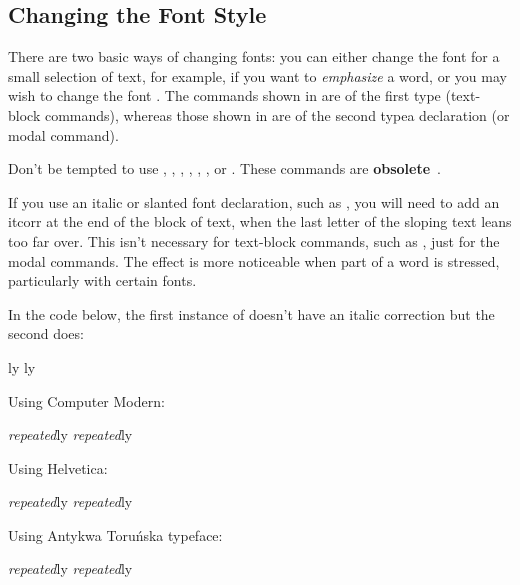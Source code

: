 \reportpagebreak
{}
\subsection{Changing the Font Style}
\label{sec:fontstyle}

There are two basic ways of changing fonts: you can either change
the font for a small selection of text, for example, if you want to
\emph{emphasize} a word, or you may wish to change the font . The \glspl{command} shown in
 are of the first type (text-block
commands), whereas those shown
in  are of the second type\dash a
\gls{declaration} (or modal command).


\warning Don't be tempted to use , , , 
, , ,  or . 
These commands are \textbf{obsolete}~\cite{l2tabu}.

If you use an italic or slanted font declaration, such as
, you will need to add an 
\gls{itcorr} at the end of the block of text, when the last letter
of the sloping text leans too far over. This isn't necessary for
text-block commands, such as , just for the modal
commands. The effect is more noticeable when part of a word is
stressed, particularly with certain fonts.


In the code below, the first instance of  doesn't have an italic
correction but the second does: 
\begin{codeS}
ly ly
\end{codeS}%
Using Computer Modern:
\begin{resultS}\selectfont
{\itshape repeated}ly {\itshape repeated\/}ly
\end{resultS}
Using Helvetica:
\begin{resultS}\selectfont
{\itshape repeated}ly {\itshape repeated\/}ly
\end{resultS}
Using Antykwa Toru\'nska typeface:
\begin{resultS}
{\itshape repeated}ly {\itshape repeated\/}ly
\end{resultS}


